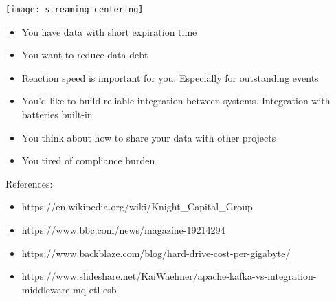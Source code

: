 \documentclass[aspectratio=169, 15pt,usenames,dvipsnames]{beamer}
\begin{document}
\begin{gdsw}
	\centering\texttt{[image: streaming-centering]}         
	\begin{center} 
		\begin{itemize}
			\item You have data with short expiration time
			      \pause
			\item You want to reduce data debt
			      \pause
			\item Reaction speed is important for you. Especially for outstanding events
			      \pause
			\item You'd like to build reliable integration between systems. Integration with batteries built-in
			      \pause
			\item You think about how to share your data with other projects
			      \pause
			\item You tired of compliance burden
		\end{itemize}
	\end{center}
\end{gdsw}
\begin{gdsw}
	\par
	References:
	\begin{center}\tiny
		\begin{itemize}
			\item https://en.wikipedia.org/wiki/Knight\_Capital\_Group
			\item https://www.bbc.com/news/magazine-19214294
			\item https://www.backblaze.com/blog/hard-drive-cost-per-gigabyte/
			\item https://www.slideshare.net/KaiWaehner/apache-kafka-vs-integration-middleware-mq-etl-esb
		\end{itemize}
	\end{center}
\end{gdsw}
    	
\end{document}
